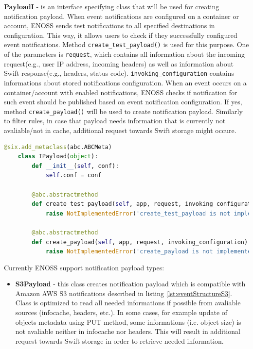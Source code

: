     \textbf{PayloadI} - is an interface specifying class that will be used for creating notification payload. When event notifications are configured on a container or account, ENOSS sends test notifications to all specified destinations in configuration. This way, it allows users to check if they successfully configured event notifications. Method \texttt{create\_test\_payload()} is used for this purpose. One of the parameters is \texttt{request}, which contains all information about the incoming request(e.g., user IP address, incoming headers) as well as information about Swift response(e.g., headers, status code). \texttt{invoking\_configuration} contains informations about stored notifications configuration. When an event occurs on a container/account with enabled notifications, ENOSS checks if notification for such event should be published based on event notification configuration. If yes, method \texttt{create\_payload()} will be used to create notification payload. Similarly to filter rules, in case that payload needs information that is currently not avaliable/not in cache, additional request towards Swift storage might occure.

    \begin{lstlisting}[language=Python, style=pythonStyle, caption=Interface of class used to create notification payload, label=lst:enoss-payloadi]
    @six.add_metaclass(abc.ABCMeta)
    class IPayload(object):
        def __init__(self, conf):
            self.conf = conf

        @abc.abstractmethod
        def create_test_payload(self, app, request, invoking_configuration):
            raise NotImplementedError('create_test_payload is not implemented')

        @abc.abstractmethod
        def create_payload(self, app, request, invoking_configuration):
            raise NotImplementedError('create_payload is not implemented')
    \end{lstlisting}

    Currently ENOSS support notification payload types:
    \begin{itemize}
        \item \textbf{S3Payload} - this class creates notification payload which is compatible with Amazon AWS S3 notifications described in listing \ref{lst:eventStructureS3}. Class is optimized to read all needed informations if possible from avaliable sources (infocache, headers, etc.). In some cases, for example update of objects metadata using PUT method, some informations (i.e. object size) is not avaliable neither in infocache nor headers. This will result in additional request towards Swift storage in order to retrieve needed information.
    \end{itemize}

